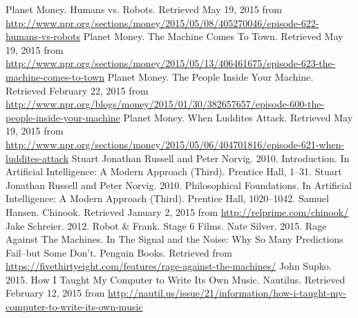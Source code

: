 \documentclass[nobib]{tufte-handout}
\begin{document}
\newline \vspace{.15in}
\noindent
[9]Planet Money. Humans vs. Robots. Retrieved May 19, 2015 from \url{http://www.npr.org/sections/money/2015/05/08/405270046/episode-622-humans-vs-robots}
\newline \vspace{.15in}
\noindent
[10]Planet Money. The Machine Comes To Town. Retrieved May 19, 2015 from \url{http://www.npr.org/sections/money/2015/05/13/406461675/episode-623-the-machine-comes-to-town}
\newline \vspace{.15in}
\noindent
[11]Planet Money. The People Inside Your Machine. Retrieved February 22, 2015 from \url{http://www.npr.org/blogs/money/2015/01/30/382657657/episode-600-the-people-inside-your-machine}
\newline \vspace{.15in}
\noindent
[12]Planet Money. When Luddites Attack. Retrieved May 19, 2015 from \url{http://www.npr.org/sections/money/2015/05/06/404701816/episode-621-when-luddites-attack}
\newline \vspace{.15in}
\noindent
[13]Stuart Jonathan Russell and Peter Norvig. 2010. Introduction. In Artificial Intelligence: A Modern Approach (Third). Prentice Hall, 1--31.
\newline \vspace{.15in}
\noindent
[14]Stuart Jonathan Russell and Peter Norvig. 2010. Philosophical Foundations. In Artificial Intelligence: A Modern Approach (Third). Prentice Hall, 1020--1042.
\newline \vspace{.15in}
\noindent
[15]Samuel Hansen. Chinook. Retrieved January 2, 2015 from \url{http://relprime.com/chinook/}
\newline \vspace{.15in}
\noindent
[16]Jake Schreier. 2012. Robot \& Frank. Stage 6 Films.
\newline \vspace{.15in}
\noindent
[17]Nate Silver. 2015. Rage Against The Machines. In The Signal and the Noise: Why So Many Predictions Fail--but Some Don't. Penguin Books. Retrieved from \url{https://fivethirtyeight.com/features/rage-against-the-machines/}
\newline \vspace{.15in}
\noindent
[18]John Supko. 2015. How I Taught My Computer to Write Its Own Music. Nautilus. Retrieved February 12, 2015 from \url{http://nautil.us/issue/21/information/how-i-taught-my-computer-to-write-its-own-music}
\end{document}
